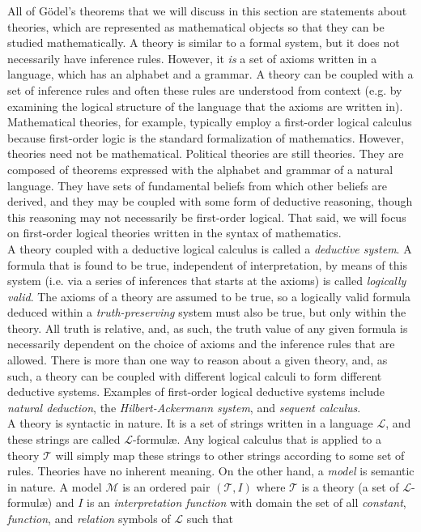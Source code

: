 All of G\"odel's theorems that we will discuss in this section are statements about theories, which are represented as mathematical objects so that they can be studied mathematically. A theory is similar to a formal system, but it does not necessarily have inference rules. However, it \textit{is} a set of axioms written in a language, which has an alphabet and a grammar. A theory can be coupled with a set of inference rules and often these rules are understood from context (e.g. by examining the logical structure of the language that the axioms are written in). Mathematical theories, for example, typically employ a first-order logical calculus because first-order logic is the standard formalization of mathematics. However, theories need not be mathematical. Political theories are still theories. They are composed of theorems expressed with the alphabet and grammar of a natural language. They have sets of fundamental beliefs from which other beliefs are derived, and they may be coupled with some form of deductive reasoning, though this reasoning may not necessarily be first-order logical. That said, we will focus on first-order logical theories written in the syntax of mathematics. \\

A theory coupled with a deductive logical calculus is called a \textit{deductive system}. A formula that is found to be true, independent of interpretation, by means of this system (i.e. via a series of inferences that starts at the axioms) is called \textit{logically valid}. The axioms of a theory are assumed to be true, so a logically valid formula deduced within a \textit{truth-preserving} system must also be true, but only within the theory. All truth is relative, and, as such, the truth value of any given formula is necessarily dependent on the choice of axioms and the inference rules that are allowed. There is more than one way to reason about a given theory, and, as such, a theory can be coupled with different logical calculi to form different deductive systems. Examples of first-order logical deductive systems include \textit{natural deduction}, the \textit{Hilbert-Ackermann system}, and \textit{sequent calculus}. \\

A theory is syntactic in nature. It is a set of strings written in a language $\mathcal{L}$, and these strings are called $\mathcal{L}$-formul{\ae}. Any logical calculus that is applied to a theory $\mathcal{T}$ will simply map these strings to other strings according to some set of rules. Theories have no inherent meaning. On the other hand, a \textit{model} is semantic in nature. A model $\mathcal{M}$ is an ordered pair $(\mathcal{T},I)$ where $\mathcal{T}$ is a theory (a set of $\mathcal{L}$-formul{\ae}) and $I$ is an \textit{interpretation function} with domain the set of all \textit{constant}, \textit{function}, and \textit{relation} symbols of $\mathcal{L}$ such that

